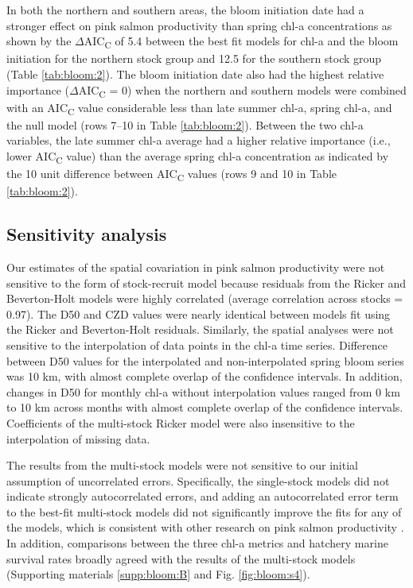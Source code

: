 In both the northern and southern areas, the bloom initiation date had a
stronger effect on pink salmon productivity than spring chl-a concentrations as
shown by the \(\Delta\)AIC\textsubscript{C} of 5.4 between the best fit models
for chl-a and the bloom initiation for the northern stock group and 12.5 for the
southern stock group (Table \ref{tab:bloom:2}).  The bloom initiation date also
had the highest relative importance (\(\Delta\)AIC\textsubscript{C} = 0) when
the northern and southern models were combined with an AIC\textsubscript{C}
value considerable less than late summer chl-a, spring chl-a, and the null model
(rows 7--10 in Table \ref{tab:bloom:2}). Between the two chl-a variables, the
late summer chl-a average had a higher relative importance (i.e., lower
AIC\textsubscript{C} value) than the average spring chl-a concentration as
indicated by the 10 unit difference between AIC\textsubscript{C} values (rows 9
and 10 in Table \ref{tab:bloom:2}).


\subsection{Sensitivity analysis}

Our estimates of the spatial covariation in pink salmon productivity were not
sensitive to the form of stock-recruit model because residuals from the Ricker
and Beverton-Holt models were highly correlated (average correlation across
stocks = 0.97). The D50 and CZD values were nearly identical between models fit
using the Ricker and Beverton-Holt residuals. Similarly, the spatial analyses
were not sensitive to the interpolation of data points in the chl-a time series.
Difference between D50 values for the interpolated and non-interpolated spring
bloom series was 10 km, with almost complete overlap of the confidence
intervals. In addition, changes in D50 for monthly chl-a without interpolation
values ranged from 0 km to 10 km across months with almost complete overlap of
the confidence intervals. Coefficients of the multi-stock Ricker model were also
insensitive to the interpolation of missing data.

The results from the multi-stock models were not sensitive to our initial
assumption of uncorrelated errors. Specifically, the single-stock models did not
indicate strongly autocorrelated errors, and adding an autocorrelated error term
to the best-fit multi-stock models did not significantly improve the fits for
any of the models, which is consistent with other research on pink salmon
productivity \citep{Pyper2001a}. In addition, comparisons between the three
chl-a metrics and hatchery marine survival rates broadly agreed with the results
of the multi-stock models (Supporting materials \ref{supp:bloom:B} and Fig.
\ref{fig:bloom:s4}).



